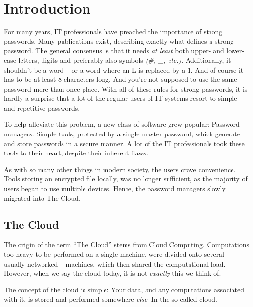 















\chapter{Introduction}
\label{chap:intro}
	For many years, IT professionals have preached the importance of strong passwords. Many publications exist, describing exactly what defines a strong password. The general consensus is that it needs \emph{at least} both upper- and lower-case letters, digits and preferably also symbols \emph{(\#, \_, etc.)}. Additionally, it shouldn't be a word -- or a word where an L is replaced by a 1. And of course it has to be at least 8 characters long. And you're not supposed to use the same password more than once place. With all of these rules for strong passwords, it is hardly a surprise that a lot of the regular users of IT systems resort to simple and repetitive passwords.

	To help alleviate this problem, a new class of software grew popular: Password managers. Simple tools, protected by a single master password, which generate and store passwords in a secure manner. A lot of the IT professionals took these tools to their heart, despite their inherent flaws. 

	As with so many other things in modern society, the users crave convenience. Tools storing an encrypted file locally, was no longer sufficient, as the majority of users began to use multiple devices. Hence, the password managers slowly migrated into The Cloud.

	\section{The Cloud}
		The origin of the term ``The Cloud'' stems from Cloud Computing. Computations too heavy to be performed on a single machine, were divided onto several -- usually networked -- machines, which then shared the computational load. However, when we say the cloud today, it is not \emph{exactly} this we think of.

		The concept of the cloud is simple: Your data, and any computations associated with it, is stored and performed somewhere \emph{else}: In the so called cloud.


